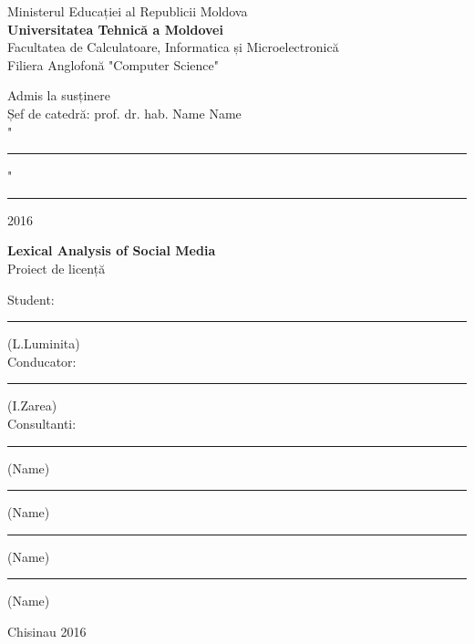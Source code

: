 
\begin{titlepage}

\newcommand{\HRule}{\rule{\linewidth}{0.5mm}}

\center 
 
 

Ministerul Educației al Republicii Moldova\\  

\textbf{Universitatea Tehnică a Moldovei}\\ 

Facultatea de Calculatoare, Informatica și Microelectronică\\
Filiera Anglofonă "Computer Science"\\


\vspace{2cm}



\hfill Admis la susținere\\
\hfill Șef de catedră: prof. dr. hab. Name Name\\

\vspace{0.4cm}
\hfill "\rule{0.75cm}{0.2mm}" \ \rule{3cm}{0.2mm} 2016
\vspace{3cm}




\begin{center}
\Large \textbf{Lexical Analysis of Social Media}\\
\vspace{0.6cm}
Proiect de licență
\end{center}
\vspace{1cm}


\hfill Student: \rule{3.9cm}{0.2mm}(L.Luminita)\\
\vspace{0.2cm}
\hfill Conducator: \rule{4cm}{0.2mm}(I.Zarea)\\
\vspace{0.2cm}
\hfill Consultanti: \rule{4.2cm}{0.2mm}(Name)\\
\vspace{0.2cm}
\hfill \rule{4cm}{0.2mm}(Name)\\
\vspace{0.2cm}
\hfill \rule{3.9cm}{0.2mm}(Name)\\
\vspace{0.2cm}
\hfill \rule{4cm}{0.2mm}(Name)\\
\vspace{4cm}


\begin{center}
Chisinau 2016
\end{center}
 
\vfill 

\end{titlepage}


